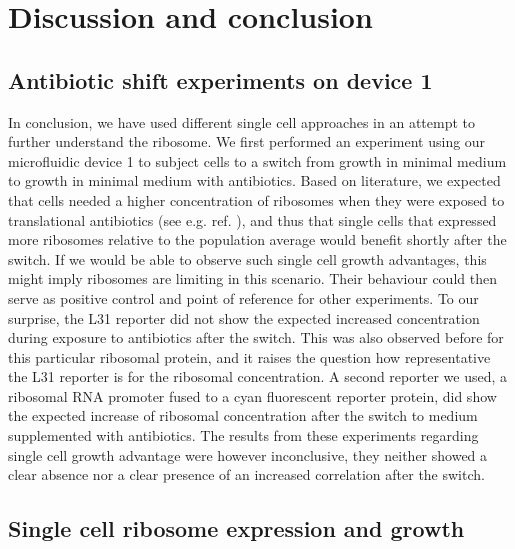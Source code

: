\section{Discussion and conclusion}


\subsection{Antibiotic shift experiments on device 1}

In conclusion, we have used different single cell approaches in an attempt to further understand the ribosome.
%
We first performed an experiment using our microfluidic device 1 to subject cells to a switch from growth in minimal medium to growth in minimal medium with antibiotics.
Based on literature, we expected that cells needed a higher concentration of ribosomes when they were exposed to translational antibiotics (see e.g. ref. \cite{You2013}), and thus that single cells that expressed more ribosomes relative to the population average would benefit shortly after the switch.
%
If we would be able to observe such single cell growth advantages, this might imply 
ribosomes are limiting in this scenario.
Their behaviour could then serve 
as positive control and point of reference for other experiments. 
%
To our surprise, the L31 reporter did not show the expected increased concentration during exposure to antibiotics after the switch.
%
This was also observed before \cite{Walker2016t} for this particular ribosomal protein, and it
raises the question how representative the L31 reporter is for the ribosomal concentration.
%
A second reporter we used, a ribosomal RNA promoter fused to a cyan fluorescent reporter protein, did show the expected increase of ribosomal concentration after the switch to medium supplemented with antibiotics.
%
The results from these experiments regarding single cell growth advantage were however inconclusive, they neither showed a clear absence nor a clear presence of an increased correlation after the switch.

\subsection{Single cell ribosome expression and growth}

